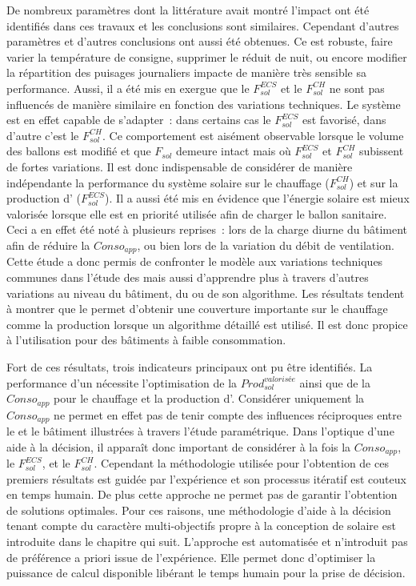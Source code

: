 De nombreux paramètres dont la littérature avait montré l’impact ont été identifiés dans
ces travaux et les conclusions sont similaires. Cependant d’autres paramètres et d’autres
conclusions ont aussi été obtenues. Ce  est robuste, faire varier la température de
consigne, supprimer le réduit de nuit, ou encore modifier la répartition des puisages
journaliers impacte de manière très sensible sa performance. Aussi, il a été mis en exergue que
le $F_{sol}^{ECS}$ et le $F_{sol}^{CH}$ ne sont pas influencés de manière similaire en
fonction des variations techniques. Le système est en effet capable de s’adapter~: dans
certains cas le $F_{sol}^{ECS}$ est favorisé, dans d’autre c’est le $F_{sol}^{CH}$. Ce
comportement est aisément observable lorsque le volume des ballons est modifié et que
$F_{sol}$ demeure intact mais où $F_{sol}^{ECS}$ et $F_{sol}^{CH}$ subissent de fortes
variations. Il est donc indispensable de considérer de manière indépendante la performance
du système solaire sur le chauffage ($F_{sol}^{CH}$) et sur la production d’
($F_{sol}^{ECS}$). Il a aussi été mis en évidence que l’énergie solaire est mieux
valorisée lorsque elle est en priorité utilisée afin de charger le ballon
sanitaire. Ceci a en effet été noté à plusieurs reprises~: lors de la charge diurne du
bâtiment afin de réduire la $Conso_{app}$, ou bien lors de la variation du débit de
ventilation. Cette étude a donc permis de confronter le modèle aux variations techniques
communes dans l’étude des  mais aussi d’apprendre plus à travers d’autres variations
au niveau du bâtiment, du  ou de son algorithme. Les résultats tendent à
montrer que le  permet d’obtenir une couverture importante sur le chauffage comme la
production  lorsque un algorithme détaillé est utilisé. Il est donc propice à
l’utilisation pour des bâtiments à faible consommation.

Fort de ces résultats, trois indicateurs principaux ont pu être identifiés. La performance
d’un  nécessite l’optimisation de la $Prod_{sol}^{valorisée}$ ainsi que de la
$Conso_{app}$ pour le chauffage et la production d’. Considérer uniquement la
$Conso_{app}$ ne permet en effet pas de tenir compte des influences réciproques entre le
 et le bâtiment illustrées à travers l’étude paramétrique. Dans l’optique d’une
aide à la décision, il apparaît donc important de considérer à la fois la $Conso_{app}$,
le $F_{sol}^{ECS}$, et le $F_{sol}^{CH}$. Cependant la méthodologie utilisée pour
l’obtention de ces premiers résultats est guidée par l’expérience et son processus
itératif est couteux en temps humain. De plus cette approche ne permet pas de garantir
l’obtention de solutions optimales. Pour ces raisons, une méthodologie d’aide à la
décision tenant compte du caractère multi-objectifs propre à la conception de 
solaire est introduite dans le chapitre qui suit. L’approche est automatisée et
n’introduit pas de préférence a priori issue de l’expérience. Elle permet donc d’optimiser
la puissance de calcul disponible libérant le temps humain pour la prise de décision.
